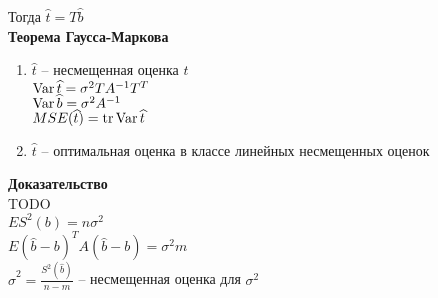\documentclass[12pt]{article}
\begin{document}
Тогда $\widehat t = T \widehat b$\\
\textbf{Теорема Гаусса-Маркова}\\
\begin{enumerate}
	\item $\widehat t$ -- несмещенная оценка $t$\\
	$\operatorname{Var} \widehat t = \sigma^2 TA^{-1}T^T$\\
	$\operatorname{Var} \widehat b = \sigma^2 A^{-1}$\\
	$MSE(\widehat{t}) = \operatorname{tr} \operatorname{Var} \widehat{t}$
	\item $\widehat t$ -- оптимальная оценка в классе линейных несмещенных оценок
\end{enumerate}
\textbf{Доказательство}\\
TODO\\
$ES^2(b) = n\sigma^2$\\
$E(\widehat b - b)^TA(\widehat{ b} -  b) = \sigma^2 m$\\
$\widehat \sigma^2 = \frac{S^2(\widehat  b)}{n - m}$ -- несмещенная оценка для $\sigma^2$\\
\end{document}
